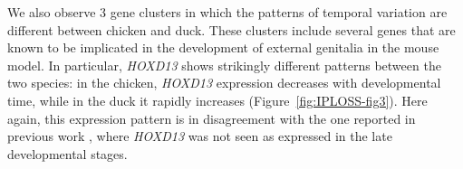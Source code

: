 We also observe 3 gene clusters in which the patterns of temporal variation are different between chicken and duck. These clusters include several genes that are known to be implicated in the development of external genitalia in the mouse model. In particular, \textit{HOXD13} shows strikingly different patterns between the two species: in the chicken, \textit{HOXD13} expression decreases with developmental time, while in the duck it rapidly increases (Figure~\ref{fig:IPLOSS-fig3}). Here again, this expression pattern is in disagreement with the one reported in previous work \citep{herrera_developmental_2013}, where \textit{HOXD13} was not seen as expressed in the late developmental stages. 



